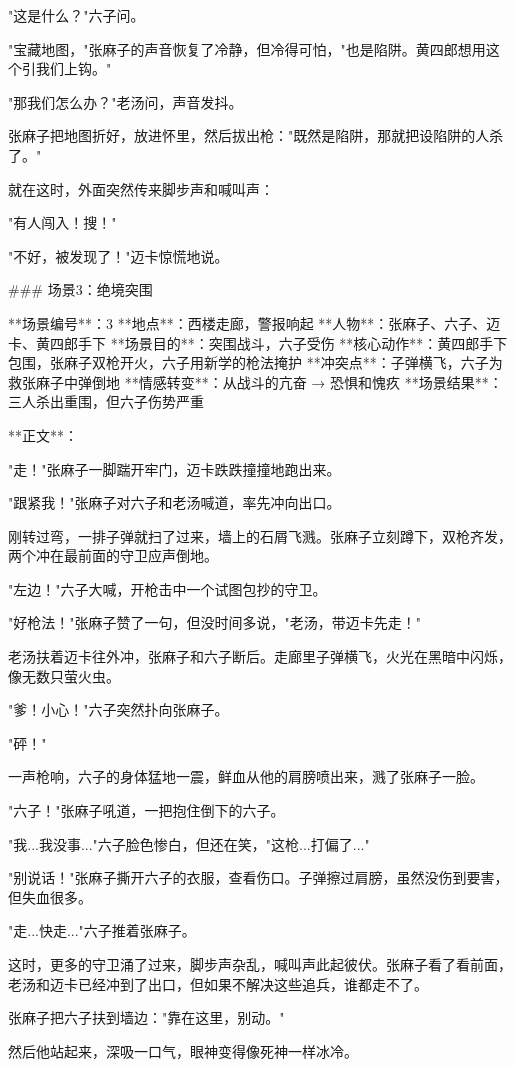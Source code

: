 "这是什么？"六子问。

"宝藏地图，"张麻子的声音恢复了冷静，但冷得可怕，"也是陷阱。黄四郎想用这个引我们上钩。"

"那我们怎么办？"老汤问，声音发抖。

张麻子把地图折好，放进怀里，然后拔出枪："既然是陷阱，那就把设陷阱的人杀了。"

就在这时，外面突然传来脚步声和喊叫声：

"有人闯入！搜！"

"不好，被发现了！"迈卡惊慌地说。

### 场景3：绝境突围

**场景编号**：3  
**地点**：西楼走廊，警报响起  
**人物**：张麻子、六子、迈卡、黄四郎手下  
**场景目的**：突围战斗，六子受伤  
**核心动作**：黄四郎手下包围，张麻子双枪开火，六子用新学的枪法掩护  
**冲突点**：子弹横飞，六子为救张麻子中弹倒地  
**情感转变**：从战斗的亢奋 → 恐惧和愧疚  
**场景结果**：三人杀出重围，但六子伤势严重

**正文**：

"走！"张麻子一脚踹开牢门，迈卡跌跌撞撞地跑出来。

"跟紧我！"张麻子对六子和老汤喊道，率先冲向出口。

刚转过弯，一排子弹就扫了过来，墙上的石屑飞溅。张麻子立刻蹲下，双枪齐发，两个冲在最前面的守卫应声倒地。

"左边！"六子大喊，开枪击中一个试图包抄的守卫。

"好枪法！"张麻子赞了一句，但没时间多说，"老汤，带迈卡先走！"

老汤扶着迈卡往外冲，张麻子和六子断后。走廊里子弹横飞，火光在黑暗中闪烁，像无数只萤火虫。

"爹！小心！"六子突然扑向张麻子。

"砰！"

一声枪响，六子的身体猛地一震，鲜血从他的肩膀喷出来，溅了张麻子一脸。

"六子！"张麻子吼道，一把抱住倒下的六子。

"我...我没事..."六子脸色惨白，但还在笑，"这枪...打偏了..."

"别说话！"张麻子撕开六子的衣服，查看伤口。子弹擦过肩膀，虽然没伤到要害，但失血很多。

"走...快走..."六子推着张麻子。

这时，更多的守卫涌了过来，脚步声杂乱，喊叫声此起彼伏。张麻子看了看前面，老汤和迈卡已经冲到了出口，但如果不解决这些追兵，谁都走不了。

张麻子把六子扶到墙边："靠在这里，别动。"

然后他站起来，深吸一口气，眼神变得像死神一样冰冷。

